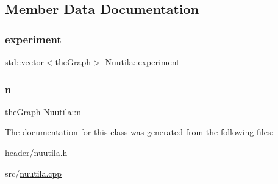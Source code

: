 \subsection{Member Data Documentation}
\mbox{\label{class_nuutila_a70e8a910cc4050d246db2540bd1e36c5_a70e8a910cc4050d246db2540bd1e36c5}} 
\subsubsection{\texorpdfstring{experiment}{experiment}}
{\footnotesize\ttfamily std\+::vector$<$\hyperlink{class_graph_component_a982e0748a6e1b8dc74986f5f8b3dca5c_a982e0748a6e1b8dc74986f5f8b3dca5c}{the\+Graph}$>$ Nuutila\+::experiment}

\mbox{\label{class_nuutila_a1409929fa0f38709497f8bdb012af71c_a1409929fa0f38709497f8bdb012af71c}} 
\subsubsection{\texorpdfstring{n}{n}}
{\footnotesize\ttfamily \hyperlink{class_graph_component_a982e0748a6e1b8dc74986f5f8b3dca5c_a982e0748a6e1b8dc74986f5f8b3dca5c}{the\+Graph} Nuutila\+::n}



The documentation for this class was generated from the following files\+:\begin{DoxyCompactItemize}
\item 
header/\hyperlink{nuutila_8h}{nuutila.\+h}\item 
src/\hyperlink{nuutila_8cpp}{nuutila.\+cpp}\end{DoxyCompactItemize}
